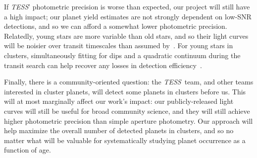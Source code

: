\documentclass[letterpaper,11pt]{article}
\newcommand{\tess}{{\it TESS}}
\begin{document}
If \tess' photometric precision is worse than expected, our project 
will still have a high impact; our planet yield estimates are not strongly 
dependent on low-SNR detections, and so we can afford a somewhat lower
photometric precision.
Relatedly, young stars are more variable than old stars, and so their light 
curves will be noisier over transit timescales than assumed
by~\citet{Sullivan_et_al_2015}.
For young stars in clusters, simultaneously fitting for dips and a 
quadratic continuum during the transit search can help recover any losses in 
detection efficiency~\citep{rizzuto_zodiacal_2017}.

Finally, there is a community-oriented question: the \tess\ team, and other 
teams interested in cluster planets, will detect some planets in clusters 
before us.
This will at most marginally affect our work's impact: our publicly-released 
light curves will still be useful for broad community science, and they will 
still achieve higher photometric precision than simple aperture photometry.
Our approach will help maximize the overall number of detected planets in 
clusters, and so no matter what will be valuable for systematically studying 
planet occurrence as a function of age.

\vspace{.3cm}



\noindent
{ \tiny
{}
}
%

\end{document}
